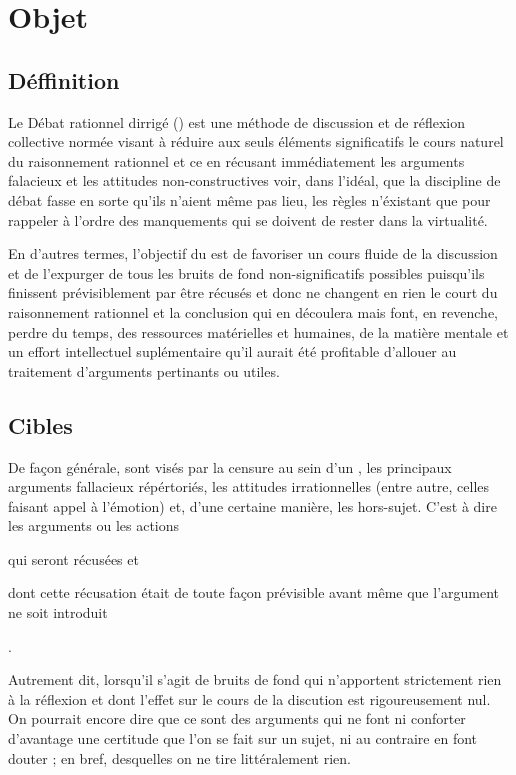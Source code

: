 \section{Objet}

\subsection{Déffinition}
Le Débat rationnel dirrigé (\mainabbr{}) est une méthode de discussion et de réflexion collective normée visant à réduire aux seuls éléments significatifs le cours naturel du raisonnement rationnel et ce en récusant immédiatement les arguments falacieux et les attitudes non-constructives voir, dans l’idéal, que la discipline de débat fasse en sorte qu’ils n’aient même pas lieu, les règles n’éxistant que pour rappeler à l’ordre des manquements qui se doivent de rester dans la virtualité.

En d’autres termes, l’objectif du \mainabbr{} est de favoriser un cours fluide de la discussion et de l’expurger de tous les bruits de fond non-significatifs possibles puisqu’ils finissent prévisiblement par être récusés et donc ne changent en rien le court du raisonnement rationnel et la conclusion qui en découlera mais font, en revenche, perdre du temps, des ressources matérielles et humaines, de la matière mentale et un effort intellectuel suplémentaire qu’il aurait été profitable d’allouer au traitement d’arguments pertinants ou utiles.

\subsection{Cibles}
De façon générale, sont visés par la censure au sein d’un \mainabbr{}, les principaux arguments fallacieux répértoriés, les attitudes irrationnelles (entre autre, celles faisant appel à l’émotion) et, d’une certaine manière, les hors-sujet. C’est à dire les arguments ou les actions
\begin{SRlist}
	\item qui seront récusées
	et
	\item dont cette récusation était de toute façon prévisible avant même que l’argument ne soit introduit%
\end{SRlist}%
.

Autrement dit, lorsqu’il s’agit de bruits de fond qui n’apportent strictement rien à la réflexion et dont l’effet sur le cours de la discution est rigoureusement nul. On pourrait encore dire que ce sont des arguments qui ne font ni conforter d’avantage une certitude que l’on se fait sur un sujet, ni au contraire en font douter ; en bref, desquelles on ne tire littéralement rien.

